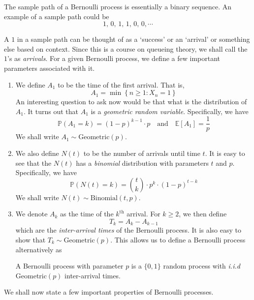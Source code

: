 \documentclass[12pt]{article}
\def\P{\mathbb{P}}
\theoremstyle{definition}
\begin{document}
The sample path of a Bernoulli process is essentially a binary sequence. An example of a sample path could be
\[
    1, \, 0, \, 1, \, 1, \, 0, \, 0, \cdots
\]

A $1$ in a sample path can be thought of as a `success' or an `arrival' or something else based on context. Since this is a course on queueing theory, we shall call the $1$'s as \emph{arrivals}. For a given Bernoulli process, we define a few important parameters associated with it. 

\begin{enumerate}
    \item We define $A_1$ to be the time of the first arrival. That is,
    \[
        A_1 = \min \left\{ n \geq 1 \colon X_n = 1 \right\}
    \]
    An interesting question to ask now would be that what is the distribution of $A_1$. It turns out that $A_1$ is a \emph{geometric random variable}. Specifically, we have
    \[
        \P\left( A_1 = k \right) = \left( 1 - p \right)^{k-1} \cdot p \quad \text{and} \quad \mathbb{E}[A_1] = \frac{1}{p}
    \]
    We shall write $A_1 \sim \text{Geometric}(p)$.
    
    \item We also define $N(t)$ to be the number of arrivals until time $t$. It is easy to see that the $N(t)$ has a \emph{binomial} distribution with parameters $t$ and $p$. Specifically, we have
    \[
        \P \left( N(t) = k \right) = \binom{t}{k} \cdot p^k \cdot \left( 1-p \right)^{t-k}
    \]
    We shall write $N(t) \sim \text{Binomial}(t, p)$.
    
    \item We denote $A_k$ as the time of the $k^{\text{th}}$ arrival. For $k \geq 2$, we then define
    \[
        T_k = A_k - A_{k-1}
    \]
    which are the \emph{inter-arrival times} of the Bernoulli process. It is also easy to show that $T_k \sim \text{Geometric}(p)$. This allows us to define a Bernoulli process alternatively as

\begin{defn}
    A Bernoulli process with parameter $p$ is a $\{0,1\}$ random process with \emph{i.i.d} Geometric$(p)$ inter-arrival times.
\end{defn}
\end{enumerate}

We shall now state a few important properties of Bernoulli processes. 
\end{document}
